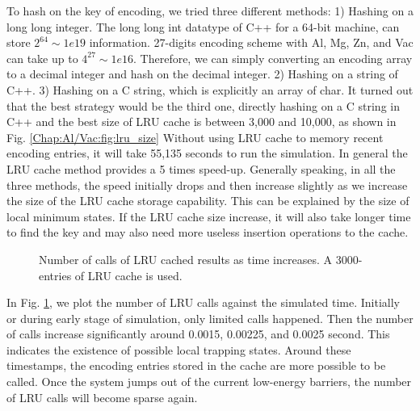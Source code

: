 To hash on the key of encoding, we tried three different methods: 1) Hashing on a long long integer. The long long int datatype of C++ for a 64-bit machine, can store $2^{64} \sim 1e19$ information. 27-digits encoding scheme with Al, Mg, Zn, and Vac can take up to $4^{27} \sim 1e16$. Therefore, we can simply converting an encoding array to a decimal integer and hash on the decimal integer. 2) Hashing on a string of C++. 3) Hashing on a C string, which is explicitly an array of char. It turned out that the best strategy would be the third one, directly hashing on a C string in C++ and the best size of \ac{LRU} cache is between 3,000 and 10,000, as shown in Fig. \ref{Chap:Al/Vac:fig:lru_size} Without using \ac{LRU} cache to memory recent encoding entries, it will take 55,135 seconds to run the simulation. In general the \ac{LRU} cache method provides a 5 times speed-up. Generally speaking, in all the three methods, the speed initially drops and then increase slightly as we increase the size of the \ac{LRU} cache storage capability. This can be explained by the size of local minimum states. If the \ac{LRU} cache size increase, it will also take longer time to find the key and may also need more useless insertion operations to the cache. 


\begingroup
\begin{figure}[!ht]
  \centering
\caption[Number of calls of \ac{LRU} cached results as time increases.]{Number of calls of \ac{LRU} cached results as time increases. A 3000-entries of \ac{LRU} cache is used.}
\label{Chap:Al/Vac:fig:lru_calls}
\end{figure}
\endgroup


In Fig. \ref{Chap:Al/Vac:fig:lru_calls}, we plot the number of \ac{LRU} calls against the simulated time. Initially or during early stage of simulation, only limited calls happened. Then the number of calls increase significantly around 0.0015, 0.00225, and 0.0025 second. This indicates the existence of possible local trapping states. Around these timestamps, the encoding entries stored in the cache are more possible to be called. Once the system jumps out of the current low-energy barriers, the number of \ac{LRU} calls will become sparse again.


